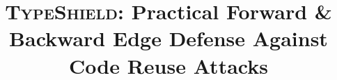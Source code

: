 \documentclass[conference]{IEEEtran}
\theoremstyle{definition}
\begin{document}

\title{\textsc{TypeShield}: Practical Forward \& Backward Edge Defense Against Code Reuse Attacks}






\pagestyle{plain}

\thispagestyle{empty}

\maketitle
\end{document}
